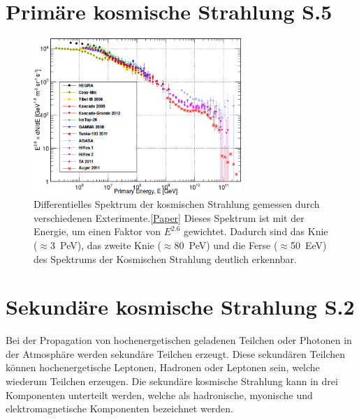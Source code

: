 \section{Primäre kosmische Strahlung S.5}
\begin{figure}[!h]
    \centering
    \includegraphics[width=0.7\textwidth]{./Plots/CR_Spectrum.png}
    \caption{Differentielles Spektrum der kosmischen Strahlung gemessen durch verschiedenen Exterimente.\ref{Paper} Dieses Spektrum ist mit der Energie, um einen Faktor von $E^{2.6}$ gewichtet. Dadurch sind das Knie ($\approx$\SI{3}{PeV}), das zweite Knie ($\approx$\SI{80}{PeV}) und die Ferse ($\approx$\SI{50}{EeV}) des Spektrums der Kosmischen Strahlung deutlich erkennbar.}
    \label{fig:SpecStrahl}
\end{figure}
\section{Sekundäre kosmische Strahlung S.2}
Bei der Propagation von hochenergetischen geladenen Teilchen oder Photonen in der Atmosphäre werden sekundäre Teilchen erzeugt. Diese sekundären Teilchen können hochenergetische Leptonen, Hadronen oder Leptonen sein, welche wiederum Teilchen erzeugen. Die sekundäre kosmische Strahlung kann in drei Komponenten unterteilt werden, welche als hadronische, myonische und elektromagnetische Komponenten bezeichnet werden.

